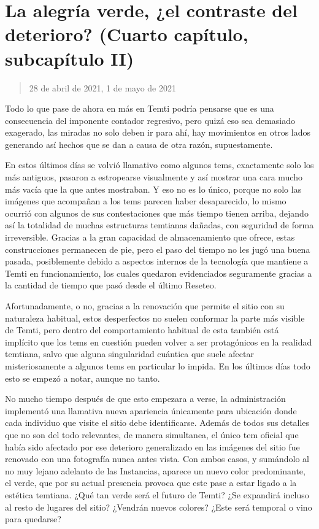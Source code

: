 \documentclass[
  spanish,
]{book}
\begin{document}
\hypertarget{la-alegruxeda-verde-el-contraste-del-deterioro-cuarto-capuxedtulo-subcapuxedtulo-ii}{%
\section{La alegría verde, ¿el contraste del deterioro? (Cuarto capítulo, subcapítulo II)}\label{la-alegruxeda-verde-el-contraste-del-deterioro-cuarto-capuxedtulo-subcapuxedtulo-ii}}

\begin{quote}
28 de abril de 2021, 1 de mayo de 2021
\end{quote}

Todo lo que pase de ahora en más en Temti podría pensarse que es una consecuencia del imponente contador regresivo, pero quizá eso sea demasiado exagerado, las miradas no solo deben ir para ahí, hay movimientos en otros lados generando así hechos que se dan a causa de otra razón, supuestamente.

En estos últimos días se volvió llamativo como algunos tems, exactamente solo los más antiguos, pasaron a estropearse visualmente y así mostrar una cara mucho más vacía que la que antes mostraban. Y eso no es lo único, porque no solo las imágenes que acompañan a los tems parecen haber desaparecido, lo mismo ocurrió con algunos de sus contestaciones que más tiempo tienen arriba, dejando así la totalidad de muchas estructuras temtianas dañadas, con seguridad de forma irreversible. Gracias a la gran capacidad de almacenamiento que ofrece, estas construcciones permanecen de pie, pero el paso del tiempo no les jugó una buena pasada, posiblemente debido a aspectos internos de la tecnología que mantiene a Temti en funcionamiento, los cuales quedaron evidenciados seguramente gracias a la cantidad de tiempo que pasó desde el último Reseteo.

Afortunadamente, o no, gracias a la renovación que permite el sitio con su naturaleza habitual, estos desperfectos no suelen conformar la parte más visible de Temti, pero dentro del comportamiento habitual de esta también está implícito que los tems en cuestión pueden volver a ser protagónicos en la realidad temtiana, salvo que alguna singularidad cuántica que suele afectar misteriosamente a algunos tems en particular lo impida. En los últimos días todo esto se empezó a notar, aunque no tanto.

No mucho tiempo después de que esto empezara a verse, la administración implementó una llamativa nueva apariencia únicamente para ubicación donde cada individuo que visite el sitio debe identificarse. Además de todos sus detalles que no son del todo relevantes, de manera simultanea, el único tem oficial que había sido afectado por ese deterioro generalizado en las imágenes del sitio fue renovado con una fotografía nunca antes vista.
Con ambos casos, y sumándolo al no muy lejano adelanto de las Instancias, aparece un nuevo color predominante, el verde, que por su actual presencia provoca que este pase a estar ligado a la estética temtiana. ¿Qué tan verde será el futuro de Temti? ¿Se expandirá incluso al resto de lugares del sitio? ¿Vendrán nuevos colores? ¿Este será temporal o vino para quedarse?
\end{document}
